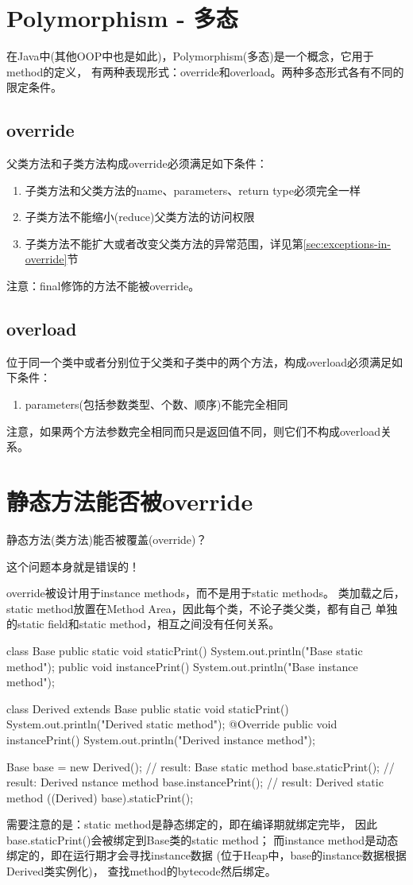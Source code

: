 \section[Polymorphism - 多态]{Polymorphism - 多态}
在Java中(其他OOP中也是如此)，Polymorphism(多态)是一个概念，它用于method的定义，
有两种表现形式：override和overload。两种多态形式各有不同的限定条件。

\subsection[override]{override}
父类方法和子类方法构成override必须满足如下条件：

\begin{enumerate}
  \item 子类方法和父类方法的name、parameters、return type必须完全一样
  \item 子类方法不能缩小(reduce)父类方法的访问权限
  \item 子类方法不能扩大或者改变父类方法的异常范围，详见第\ref{sec:exceptions-in-override}节
\end{enumerate}

注意：final修饰的方法不能被override。

\subsection[overload]{overload}
位于同一个类中或者分别位于父类和子类中的两个方法，构成overload必须满足如下条件：

\begin{enumerate}
  \item parameters(包括参数类型、个数、顺序)不能完全相同
\end{enumerate}

注意，如果两个方法参数完全相同而只是返回值不同，则它们不构成overload关系。

\section[静态方法能否被override]{静态方法能否被override}
静态方法(类方法)能否被覆盖(override)？

这个问题本身就是错误的！

override被设计用于instance methods，而不是用于static methods。
类加载之后，static method放置在Method Area，因此每个类，不论子类父类，都有自己
单独的static field和static method，相互之间没有任何关系。

\begin{javacode}
class Base {
  public static void staticPrint() {
    System.out.println("Base static method");
  }
  public void instancePrint() {
    System.out.println("Base instance method");
  }
}

class Derived extends Base {
  public static void staticPrint() {
    System.out.println("Derived static method");
  }
  @Override
  public void instancePrint() {
    System.out.println("Derived instance method");
  }
}

Base base = new Derived();
// result: Base static method
base.staticPrint();
// result: Derived nstance method
base.instancePrint();
// result: Derived static method
((Derived) base).staticPrint();
\end{javacode}

需要注意的是：static method是静态绑定的，即在编译期就绑定完毕，
因此base.staticPrint()会被绑定到Base类的static method；
而instance method是动态绑定的，即在运行期才会寻找instance数据
(位于Heap中，base的instance数据根据Derived类实例化)，
查找method的bytecode然后绑定。
